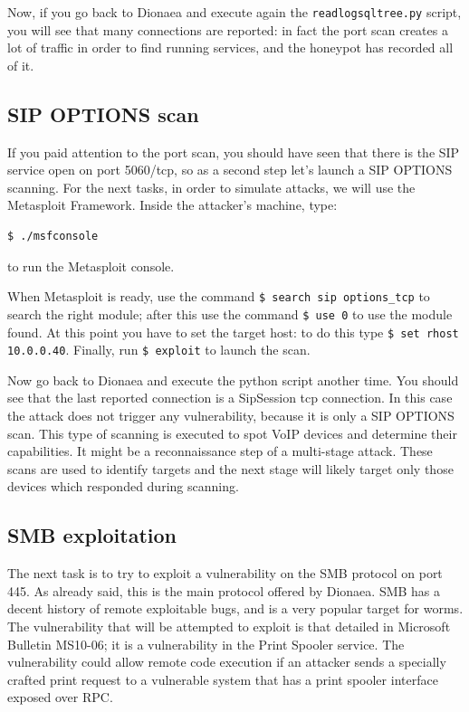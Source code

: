 \documentclass[epsfig,a4paper,11pt,titlepage,oneside,openany]{book}
\begin{document}
Now, if you go back to Dionaea and execute again the \texttt{readlogsqltree.py} script, you will see that many connections are reported: in fact the port scan creates a lot of traffic in order to find running services, and the honeypot has recorded all of it.

\subsection{SIP OPTIONS scan}

If you paid attention to the port scan, you should have seen that there is the SIP service open on port 5060/tcp, so as a second step let’s launch a SIP OPTIONS scanning. For the next tasks, in order to simulate attacks, we will use the Metasploit Framework. Inside the attacker’s machine, type:
\begin{lstlisting}[language=bash]
$ ./msfconsole
\end{lstlisting}
to run the Metasploit console.

When Metasploit is ready, use the command \texttt{\$ search sip options\_tcp} to search the right module; after this use the command \texttt{\$ use 0} to use the module found. At this point you have to set the target host: to do this type \texttt{\$ set rhost 10.0.0.40}. Finally, run \texttt{\$ exploit} to launch the scan.

Now go back to Dionaea and execute the python script another time. You should see that the last reported connection is a SipSession tcp connection. In this case the attack does not trigger any vulnerability, because it is only a SIP OPTIONS scan. This type of scanning is executed to spot VoIP devices and determine their capabilities. It might be a reconnaissance step of a multi-stage attack. These scans are used to identify targets and the next stage will likely target only those devices which responded during scanning. \cite{ENISA}

\subsection{SMB exploitation}

The next task is to try to exploit a vulnerability on the SMB protocol on port 445. As already said, this is the main protocol offered by Dionaea. SMB has a decent history of remote exploitable bugs, and is a very popular target for worms. The vulnerability that will be attempted to exploit is that detailed in Microsoft Bulletin MS10-06; it is a vulnerability in the Print Spooler service. The vulnerability could allow remote code execution if an attacker sends a specially crafted print request to a vulnerable system that has a print spooler interface exposed over RPC.
\end{document}
